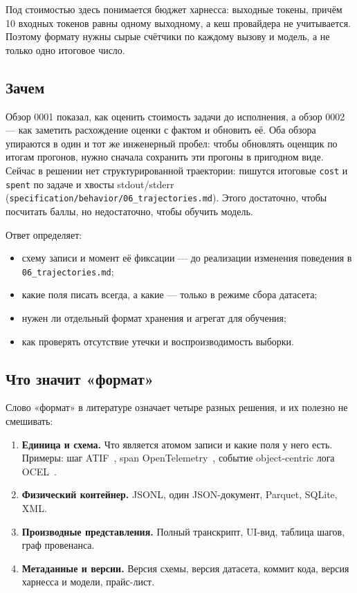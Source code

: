 \documentclass[11pt,a4paper]{article}
\begin{document}
Под стоимостью здесь понимается бюджет харнесса: выходные токены, причём
10 входных токенов равны одному выходному, а кеш провайдера не учитывается.
Поэтому формату нужны сырые счётчики по каждому вызову и модель, а не только
одно итоговое число.

\subsection{Зачем}

Обзор 0001 показал, как оценить стоимость задачи до исполнения, а обзор
0002 — как заметить расхождение оценки с фактом и обновить её. Оба обзора
упираются в один и тот же инженерный пробел: чтобы обновлять оценщик по
итогам прогонов, нужно сначала сохранить эти прогоны в пригодном виде.
Сейчас в решении нет структурированной траектории: пишутся итоговые
\texttt{cost} и \texttt{spent} по задаче и хвосты stdout/stderr
(\texttt{specification/behavior/06\_trajectories.md}). Этого достаточно,
чтобы посчитать баллы, но недостаточно, чтобы обучить модель.

Ответ определяет:

\begin{itemize}
  \item схему записи и момент её фиксации — до реализации изменения
        поведения в \texttt{06\_trajectories.md};
  \item какие поля писать всегда, а какие — только в режиме сбора датасета;
  \item нужен ли отдельный формат хранения и агрегат для обучения;
  \item как проверять отсутствие утечки и воспроизводимость выборки.
\end{itemize}

\subsection{Что значит «формат»}

Слово «формат» в литературе означает четыре разных решения, и их полезно
не смешивать:

\begin{enumerate}
  \item \textbf{Единица и схема.} Что является атомом записи и какие поля у
        него есть. Примеры: шаг ATIF~\cite{atif2026}, span
        OpenTelemetry~\cite{otel2026genai}, событие object-centric лога
        OCEL~\cite{berti2024ocel}.
  \item \textbf{Физический контейнер.} JSONL, один JSON-документ, Parquet,
        SQLite, XML.
  \item \textbf{Производные представления.} Полный транскрипт, UI-вид,
        таблица шагов, граф провенанса.
  \item \textbf{Метаданные и версии.} Версия схемы, версия датасета,
        коммит кода, версия харнесса и модели, прайс-лист.
\end{enumerate}
\end{document}
